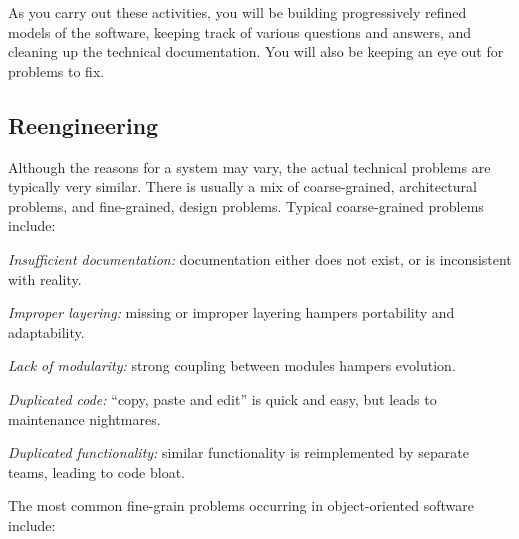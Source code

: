 \documentclass[a4paper,10pt,twoside]{book}
\begin{document}
As you carry out these activities, you will be building progressively refined models of the software, keeping track of various questions and answers, and cleaning up the technical documentation. You will also be keeping an eye out for problems to fix.

\subsection*{Reengineering}

Although the reasons for  a system may vary, the actual technical problems are typically very similar. There is usually a mix of coarse-grained, architectural problems, and fine-grained, design problems. Typical coarse-grained problems include:

\begin{bulletlist}
  \item \emph{Insufficient documentation:}
  documentation either does not exist, or is inconsistent with reality.

  \item \emph{Improper layering:}
  missing or improper layering hampers portability and adaptability.

  \item \emph{Lack of modularity:}
  strong coupling between modules hampers evolution.

  \item \emph{Duplicated code:}
  ``copy, paste and edit'' is quick and easy, but leads to maintenance nightmares.

  \item \emph{Duplicated functionality:}
  similar functionality is reimplemented by separate teams, leading to code bloat.
\end{bulletlist}

The most common fine-grain problems occurring in object-oriented software include:
\end{document}
